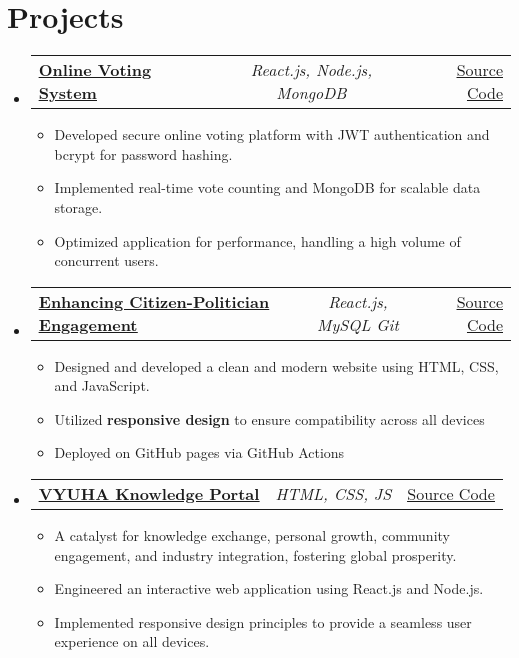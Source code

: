 \documentclass[a4paper,11pt]{article}
\makeatletter
\newcommand{\resumeItem}[1]{
  \item\small{#1}
}
\newcommand{\resumeItemListStart}{\begin{itemize}[rightmargin=0.11in]}
\newcommand{\resumeItemListEnd}{\end{itemize}}
\newcommand{\resumeTrioHeading}[3]{
  \item\small{
    \begin{tabular*}{0.96\textwidth}[t]{
      l@{\extracolsep{\fill}}c@{\extracolsep{\fill}}r
    }
      \textbf{#1} & \textit{#2} & #3
    \end{tabular*}
  }
}
\newcommand{\resumeHeadingListStart}{
  \begin{itemize}[leftmargin=0.15in, label={}]
}
\newcommand{\resumeHeadingListEnd}{\end{itemize}}
\makeatother
\begin{document}
\section{Projects}
  \resumeHeadingListStart{}
      \resumeTrioHeading{\href{https://github.com/siva12170/online_voting_system}{\uline{Online Voting System}}}{React.js,  Node.js, MongoDB}{\href{https://github.com/siva12170/PMK-WEBSITE-TDP-.git}{\uline{Source Code}}}
      \resumeItemListStart{}
        \resumeItem{Developed secure online voting platform with JWT authentication and bcrypt for password hashing.}
        \resumeItem{Implemented real-time vote counting and MongoDB for scalable data storage.}
        \resumeItem{Optimized application for performance, handling a high volume of concurrent users.}
      \resumeItemListEnd{}
    \resumeTrioHeading{\href{https://github.com/siva12170/PMK-WEBSITE-TDP-.git}{\uline{Enhancing Citizen-Politician Engagement}}}{React.js, MySQL Git}{\href{https://github.com/siva12170/PMK-WEBSITE-TDP-.git}{\uline{Source Code}}}
      \resumeItemListStart{}
        \resumeItem{Designed and developed a clean and modern website using HTML, CSS, and JavaScript.}
        \resumeItem{Utilized \textbf{responsive design} to ensure compatibility across all devices}
        \resumeItem{Deployed on GitHub pages via GitHub Actions}
      \resumeItemListEnd{}

      \resumeTrioHeading{\href{https://github.com/siva12170/vyuha_main}{\uline{VYUHA Knowledge Portal}}}{HTML, CSS, JS}{\href{https://github.com/siva12170/vyuha_main}{\uline{Source Code}}}
      \resumeItemListStart{}
        \resumeItem{A catalyst for knowledge exchange, personal growth, community engagement, and industry integration, fostering global prosperity.}
        \resumeItem{Engineered an interactive web application using React.js and Node.js.}
        \resumeItem{Implemented responsive design principles to provide a seamless user experience on all devices.}
      \resumeItemListEnd{}
  \resumeHeadingListEnd{}


\end{document}
